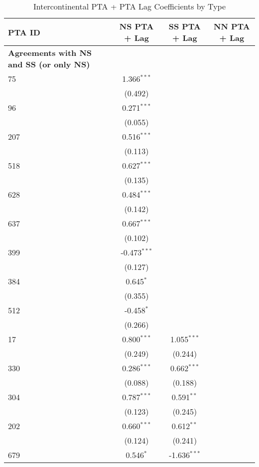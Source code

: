 \begin{table}[htbp]
    \centering
    \caption{Intercontinental PTA + PTA Lag Coefficients by Type}
    \label{tab:intercontinental_pta}
    \begin{adjustbox}{max width=\textwidth}
    \begin{tabular}{lccc}
    \hline
    \textbf{PTA ID} & \textbf{NS PTA + Lag} & \textbf{SS PTA + Lag} & \textbf{NN PTA + Lag} \\
    \hline
    \textbf{Agreements with NS and SS (or only NS)} &  &  &  \\
    \hline
    75  & 1.366$^{\ast\ast\ast}$ &  &  \\
    & (0.492) &  &  \\
    96  & 0.271$^{\ast\ast\ast}$ &  &  \\
    & (0.055) &  &  \\
    207 & 0.516$^{\ast\ast\ast}$ &  &  \\
    & (0.113) &  &  \\
    518 & 0.627$^{\ast\ast\ast}$ &  &  \\
    & (0.135) &  &  \\
    628 & 0.484$^{\ast\ast\ast}$ &  &  \\
    & (0.142) &  &  \\
    637 & 0.667$^{\ast\ast\ast}$ &  &  \\
    & (0.102) &  &  \\
    399 & -0.473$^{\ast\ast\ast}$ &  &  \\
    & (0.127) &  &  \\
    384 & 0.645$^{\ast}$ &  &  \\
    & (0.355) &  &  \\
    512 & -0.458$^{\ast}$ &  &  \\
    & (0.266) &  &  \\
    17  & 0.800$^{\ast\ast\ast}$ & 1.055$^{\ast\ast\ast}$ &  \\
    & (0.249) & (0.244) &  \\
    330 & 0.286$^{\ast\ast\ast}$ & 0.662$^{\ast\ast\ast}$ &  \\
    & (0.088) & (0.188) &  \\
    304 & 0.787$^{\ast\ast\ast}$ & 0.591$^{\ast\ast}$ &  \\
    & (0.123) & (0.245) &  \\
    202 & 0.660$^{\ast\ast\ast}$ & 0.612$^{\ast\ast}$ &  \\
    & (0.124) & (0.241) &  \\
    679 & 0.546$^{\ast}$ & -1.636$^{\ast\ast\ast}$ &  \\

\end{tabular}
\end{adjustbox}
\end{table}
